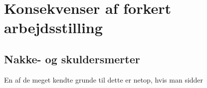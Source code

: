 \section{Konsekvenser af forkert arbejdsstilling}
\subsection{Nakke- og skuldersmerter}
En af de meget kendte grunde til dette er netop, hvis man sidder 